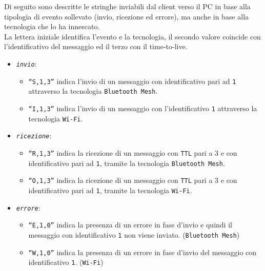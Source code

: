 \noindent Di seguito sono descritte le stringhe inviabili dal client verso il PC in base alla tipologia di evento sollevato (invio, ricezione ed errore), ma anche in base alla tecnologia che lo ha innescato. \\
La lettera iniziale identifica l'evento e la tecnologia, il secondo valore coincide con l'identificativo del messaggio ed il terzo con il time-to-live.
\begin{itemize}
    \item \textit{\texttt{invio}}:
    \begin{itemize}
        \item \texttt{``S,1,3''} indica l'invio di un messaggio con identificativo pari ad \texttt{1} attraverso la tecnologia \texttt{Bluetooth Mesh}.
        
        \item \texttt{``I,1,3''} indica l'invio di un messaggio con l'identificativo \texttt{1} attraverso la tecnologia \texttt{Wi-Fi}.
    \end{itemize}

    \item \textit{\texttt{ricezione}}:
    \begin{itemize}
        \item \texttt{``R,1,3''} indica la ricezione di un messaggio con \texttt{TTL} pari a 3 e con identificativo pari ad \texttt{1}, tramite la tecnologia \texttt{Bluetooth Mesh}.
        
        \item \texttt{``O,1,3''} indica la ricezione di un messaggio con \texttt{TTL} pari a 3 e con identificativo pari ad \texttt{1}, tramite la tecnologia \texttt{Wi-Fi}.
    \end{itemize}
    
    \item \textit{\texttt{errore}}:
    \begin{itemize}
        \item \texttt{``E,1,0''} indica la presenza di un errore in fase d'invio e quindi il messaggio con identificativo \texttt{1} non viene inviato. (\texttt{Bluetooth Mesh})
        
        \item \texttt{``W,1,0''} indica la presenza di un errore in fase d'invio del messaggio con identificativo \texttt{1}. (\texttt{Wi-Fi})
    \end{itemize}
\end{itemize}

